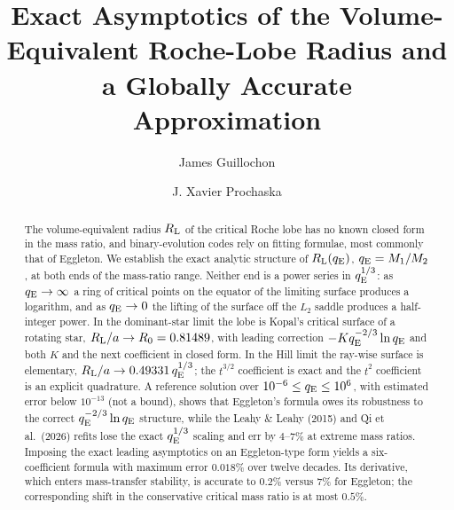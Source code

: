 \documentclass[twocolumn]{aastex702}
\begin{document}
\title{Exact Asymptotics of the Volume-Equivalent Roche-Lobe Radius and a Globally Accurate Approximation}

\author[orcid=0000-0002-9809-8215,gname=James,sname=Guillochon]{James Guillochon}

\author[orcid=0000-0002-7738-6875,gname=Jason,sname=Prochaska]{J. Xavier Prochaska}


\begin{abstract}
The volume-equivalent radius $R_{\rm L}$ of the critical Roche lobe has no known closed form in the mass ratio, and binary-evolution codes rely on fitting formulae, most commonly that of Eggleton. We establish the exact analytic structure of $R_{\rm L}(q_{\rm E})$, $q_{\rm E}=M_1/M_2$, at both ends of the mass-ratio range. Neither end is a power series in $q_{\rm E}^{1/3}$: as $q_{\rm E}\to\infty$ a ring of critical points on the equator of the limiting surface produces a logarithm, and as $q_{\rm E}\to0$ the lifting of the surface off the $L_2$ saddle produces a half-integer power. In the dominant-star limit the lobe is Kopal's critical surface of a rotating star, $R_{\rm L}/a\to R_0=0.81489$, with leading correction $-Kq_{\rm E}^{-2/3}\ln q_{\rm E}$ and both $K$ and the next coefficient in closed form. In the Hill limit the ray-wise surface is elementary, $R_{\rm L}/a\to 0.49331\,q_{\rm E}^{1/3}$; the $t^{3/2}$ coefficient is exact and the $t^2$ coefficient is an explicit quadrature. A reference solution over $10^{-6}\le q_{\rm E}\le10^6$, with estimated error below $10^{-13}$ (not a bound), shows that Eggleton's formula owes its robustness to the correct $q_{\rm E}^{-2/3}\ln q_{\rm E}$ structure, while the Leahy \& Leahy (2015) and Qi et al.\ (2026) refits lose the exact $q_{\rm E}^{1/3}$ scaling and err by $4$--$7\%$ at extreme mass ratios. Imposing the exact leading asymptotics on an Eggleton-type form yields a six-coefficient formula with maximum error $0.018\%$ over twelve decades. Its derivative, which enters mass-transfer stability, is accurate to $0.2\%$ versus $7\%$ for Eggleton; the corresponding shift in the conservative critical mass ratio is at most $0.5\%$.
\end{abstract}
\end{document}
